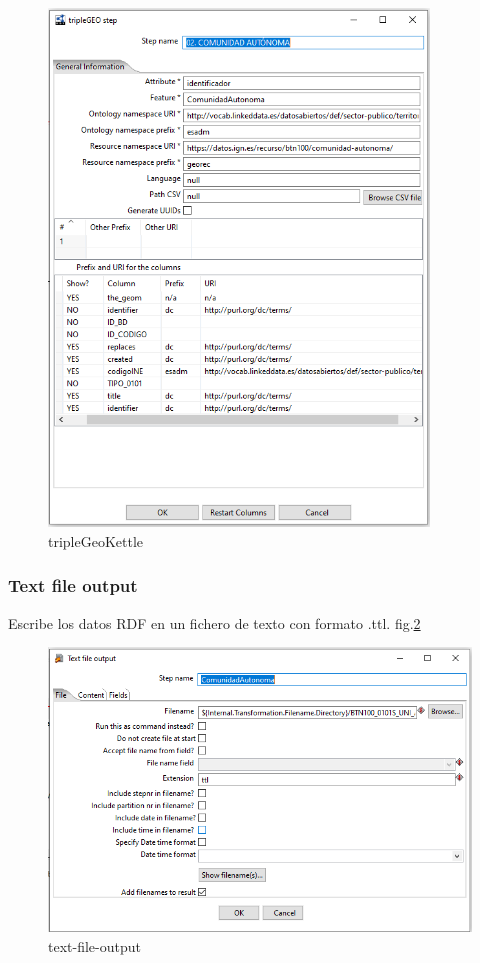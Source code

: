 \begin{figure}[H]
    \includegraphics[width=0.9\textwidth]{images/tripleGeoKettle.png}
    \centering
    \caption{tripleGeoKettle}
    \label{fig:tripleGeoKettle}
\end{figure}

\subsubsection{Text file output}
Escribe los datos RDF en un fichero de texto con formato .ttl. fig.\ref{fig:text-file-output}
\begin{figure}[H]
    \includegraphics[width=\textwidth]{images/text-file-output.png}
    \centering
    \caption{text-file-output}
    \label{fig:text-file-output}
\end{figure}

